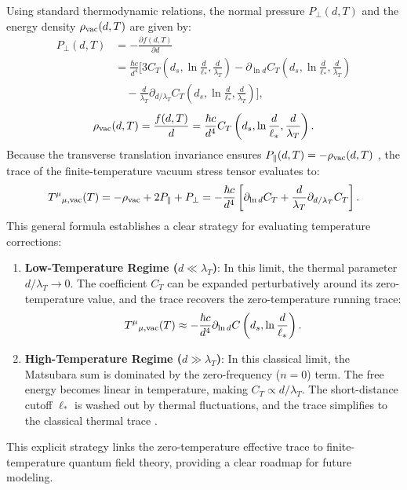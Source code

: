 \documentclass[12pt,letterpaper]{article}
\begin{document}
{Using standard thermodynamic relations, the normal pressure $P_\perp(d, T)$ and the energy density $\rho_{\rm vac}(d, T)$ are given by:
\begin{align}
P_\perp(d, T) &= -\frac{\partial f(d, T)}{\partial d} \nonumber\\
&= \frac{\hbar c}{d^4} \Big[ 3 C_T\left(d_s, \ln\frac{d}{\ell_*}, \frac{d}{\lambda_T}\right) - \partial_{\ln d}C_T\left(d_s, \ln\frac{d}{\ell_*}, \frac{d}{\lambda_T}\right) \nonumber\\
&\quad - \frac{d}{\lambda_T} \partial_{d/\lambda_T}C_T\left(d_s, \ln\frac{d}{\ell_*}, \frac{d}{\lambda_T}\right) \Big],
\label{eq:pperp_thermal}
\end{align}
\begin{equation}
\rho_{\rm vac}(d, T) = \frac{f(d, T)}{d} = \frac{\hbar c}{d^4} C_T\left(d_s, \ln\frac{d}{\ell_*}, \frac{d}{\lambda_T}\right).
\label{eq:rhovac_thermal}
\end{equation}
Because the transverse translation invariance ensures $P_\parallel(d, T) = -\rho_{\rm vac}(d, T)$ \cite{brownmaclay1969}, the trace of the finite-temperature vacuum stress tensor evaluates to:
\begin{equation}
T^\mu{}_{\mu,\rm vac}(T) = -\rho_{\rm vac} + 2P_\parallel + P_\perp = -\frac{\hbar c}{d^4} \left[ \partial_{\ln d}C_T + \frac{d}{\lambda_T} \partial_{d/\lambda_T}C_T \right].
\label{eq:trace_vacuum_thermal}
\end{equation}
This general formula establishes a clear strategy for evaluating temperature corrections:
\begin{enumerate}
    \item \textbf{Low-Temperature Regime ($d \ll \lambda_T$)}: In this limit, the thermal parameter $d/\lambda_T \to 0$. The coefficient $C_T$ can be expanded perturbatively around its zero-temperature value, and the trace recovers the zero-temperature running trace:
    \begin{equation}
    T^\mu{}_{\mu,\rm vac}(T) \approx -\frac{\hbar c}{d^4} \partial_{\ln d}C\left(d_s, \ln\frac{d}{\ell_*}\right).
    \label{eq:low_temp_limit}
    \end{equation}
    \item \textbf{High-Temperature Regime ($d \gg \lambda_T$)}: In this classical limit, the Matsubara sum is dominated by the zero-frequency ($n=0$) term. The free energy becomes linear in temperature, making $C_T \propto d/\lambda_T$. The short-distance cutoff $\ell_*$ is washed out by thermal fluctuations, and the trace simplifies to the classical thermal trace \cite{bordag2009}.
\end{enumerate}
This explicit strategy links the zero-temperature effective trace to finite-temperature quantum field theory, providing a clear roadmap for future modeling.}
\end{document}
